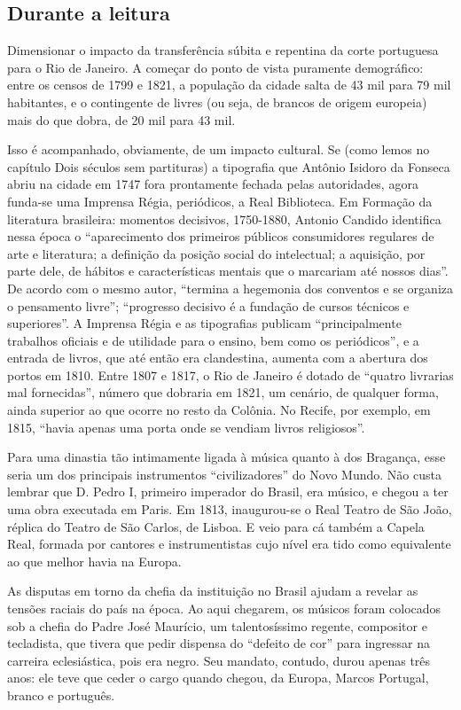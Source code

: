 \documentclass[11pt]{extarticle}
\begin{document}
\subsection{Durante a leitura}

Dimensionar o impacto da transferência súbita e repentina da corte portuguesa
para o Rio de Janeiro. A começar do ponto de vista puramente demográfico: entre
os censos de 1799 e 1821, a população da cidade salta de 43 mil para 79 mil
habitantes, e o contingente de livres (ou seja, de brancos de origem europeia)
mais do que dobra, de 20 mil para 43 mil. 

Isso é acompanhado, obviamente, de um impacto cultural. Se (como lemos no
capítulo Dois séculos sem partituras) a tipografia que Antônio Isidoro da
Fonseca abriu na cidade em 1747 fora prontamente fechada pelas autoridades,
agora funda-se uma Imprensa Régia, periódicos, a Real Biblioteca. Em Formação
da literatura brasileira: momentos decisivos, 1750-1880, Antonio Candido
identifica nessa época o “aparecimento dos primeiros públicos consumidores
regulares de arte e literatura; a definição da posição social do intelectual; a
aquisição, por parte dele, de hábitos e características mentais que o marcariam
até nossos dias”. De acordo com o mesmo autor, “termina a hegemonia dos
conventos e se organiza o pensamento livre”; “progresso decisivo é a fundação
de cursos técnicos e superiores”. A Imprensa Régia e as tipografias publicam
“principalmente trabalhos oficiais e de utilidade para o ensino, bem como os
periódicos”, e a entrada de livros, que até então era clandestina, aumenta com
a abertura dos portos em 1810. Entre 1807 e 1817, o Rio de Janeiro é dotado de
“quatro livrarias mal fornecidas”, número que dobraria em 1821, um cenário, de
qualquer forma, ainda superior ao que ocorre no resto da Colônia. No Recife,
por exemplo, em 1815, “havia apenas uma porta onde se vendiam livros
religiosos”.

Para uma dinastia tão intimamente ligada à música quanto à dos Bragança, esse
seria um dos principais instrumentos “civilizadores” do Novo Mundo. Não custa
lembrar que D. Pedro I, primeiro imperador do Brasil, era músico, e chegou a
ter uma obra executada em Paris. Em 1813, inaugurou-se o Real Teatro de São
João, réplica do Teatro de São Carlos, de Lisboa. E veio para cá também a
Capela Real, formada por cantores e instrumentistas cujo nível era tido como
equivalente ao que melhor havia na Europa.

As disputas em torno da chefia da instituição no Brasil ajudam a revelar as
tensões raciais do país na época. Ao aqui chegarem, os músicos foram colocados
sob a chefia do Padre José Maurício, um talentosíssimo regente, compositor e
tecladista, que tivera que pedir dispensa do “defeito de cor” para ingressar na
carreira eclesiástica, pois era negro. Seu mandato, contudo, durou apenas três
anos: ele teve que ceder o cargo quando chegou, da Europa, Marcos Portugal,
branco e português.
\end{document}
